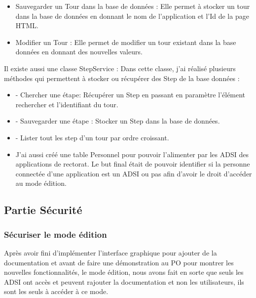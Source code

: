 \documentclass[12pt]{article}
\begin{document}
\begin{itemize}
\begin{itemize}
\item Sauvegarder un Tour dans la base de données : Elle permet à stocker un tour dans la base de données en donnant le nom de l'application et l'Id de la page HTML. 

\item Modifier un Tour : Elle permet de modifier un tour existant dans la base données en donnant des nouvelles valeurs. 
\end{itemize}

Il existe aussi une classe StepService : Dans cette classe, j'ai réalisé plusieurs méthodes qui permettent à stocker ou récupérer des Step de la base données : 
\begin{itemize}

\item  - Chercher une étape: Récupérer un Step en passant en paramètre l'élément rechercher et l'identifiant du tour.

\item - Sauvegarder une étape : Stocker un Step dans la base de données.

\item - Lister tout les step d'un tour par ordre croissant.  \\


\item J'ai aussi créé une table Personnel pour pouvoir l'alimenter par les ADSI des applications de rectorat. Le but final était de pouvoir identifier si la personne connectée d'une application est un ADSI ou pas afin d'avoir le droit d'accéder au mode édition. 

\end{itemize}
\end{itemize}
\subsection{Partie Sécurité}

\subsubsection{Sécuriser le mode édition}
	
	Après avoir fini d'implémenter l'interface graphique pour ajouter de la documentation et avant de faire une démonstration au PO pour montrer les nouvelles fonctionnalités, le mode édition, nous avons fait en sorte que seuls les ADSI ont accès et peuvent rajouter la documentation et non les utilisateurs, ils sont les seuls à accéder à ce mode.\\   
  
\end{document}
